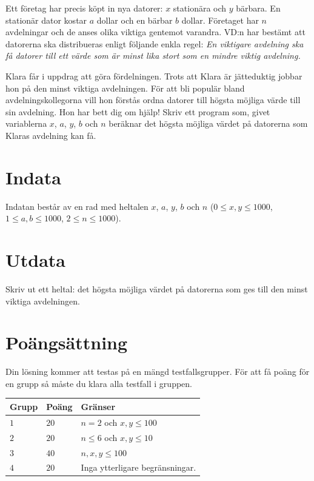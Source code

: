 
Ett företag har precis köpt in nya datorer: $x$ stationära och $y$
bärbara. En stationär dator kostar $a$ dollar och en bärbar $b$
dollar. Företaget har $n$ avdelningar och de
anses olika viktiga gentemot varandra. VD:n har bestämt att datorerna
ska distribueras enligt följande enkla regel: {\em En viktigare avdelning ska få datorer till ett värde som är minst lika stort som en mindre viktig avdelning.}

Klara får i uppdrag att göra fördelningen. Trots att Klara är jätteduktig jobbar hon på den minst viktiga avdelningen. För att bli populär bland avdelningskollegorna vill hon förstås ordna datorer till högsta möjliga värde till sin avdelning. 
Hon har bett dig om hjälp! Skriv ett program som, givet variablerna $x$, $a$, $y$, $b$ och $n$ beräknar det högsta möjliga värdet på datorerna som Klaras avdelning kan få.


\section*{Indata}
Indatan består av en rad med heltalen $x$, $a$, $y$, $b$ och $n$ ($0 \leq x,y \leq 1000$, $1 \leq a,b \leq 1000$, $2 \leq n \leq 1000$).

\section*{Utdata}
Skriv ut ett heltal: det högsta möjliga värdet på datorerna som ges till den minst viktiga avdelningen.

\section*{Poängsättning}
Din lösning kommer att testas på en mängd testfallsgrupper.
För att få poäng för en grupp så måste du klara alla testfall i gruppen.

\noindent
\begin{tabular}{| l | l | p{12cm} |}
  \hline
  \textbf{Grupp} & \textbf{Poäng} & \textbf{Gränser} \\ \hline
  $1$    & $20$        & $n=2$ och $x,y \leq 100$ \\ \hline
  $2$    & $20$        & $n \leq 6$ och $x,y \leq 10$ \\ \hline
  $3$    & $40$        & $n,x,y \leq 100$ \\ \hline
  $4$    & $20$        & Inga ytterligare begränsningar.  \\ \hline
\end{tabular}
